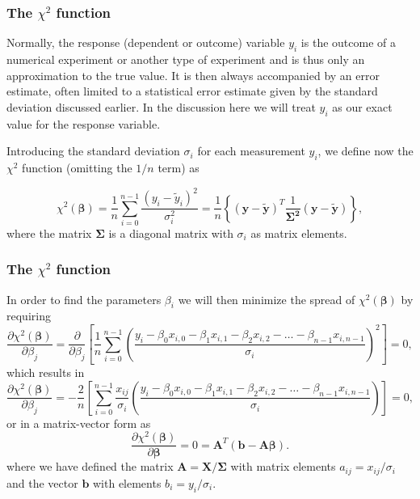 \documentclass{beamer}
\begin{document}
\begin{frame}
\frametitle{The $\chi^2$ function}

\begin{block}{}

Normally, the response (dependent or outcome) variable $y_i$ is the
outcome of a numerical experiment or another type of experiment and is
thus only an approximation to the true value. It is then always
accompanied by an error estimate, often limited to a statistical error
estimate given by the standard deviation discussed earlier. In the
discussion here we will treat $y_i$ as our exact value for the
response variable.

Introducing the standard deviation $\sigma_i$ for each measurement
$y_i$, we define now the $\chi^2$ function (omitting the $1/n$ term)
as

\[
\chi^2(\bm{\beta})=\frac{1}{n}\sum_{i=0}^{n-1}\frac{\left(y_i-\tilde{y}_i\right)^2}{\sigma_i^2}=\frac{1}{n}\left\{\left(\bm{y}-\bm{\tilde{y}}\right)^T\frac{1}{\bm{\Sigma^2}}\left(\bm{y}-\bm{\tilde{y}}\right)\right\},
\]
where the matrix $\bm{\Sigma}$ is a diagonal matrix with $\sigma_i$ as matrix elements. 

\end{block}
\end{frame}

\begin{frame}
\frametitle{The $\chi^2$ function}

\begin{block}{}

In order to find the parameters $\beta_i$ we will then minimize the spread of $\chi^2(\bm{\beta})$ by requiring
\[
\frac{\partial \chi^2(\bm{\beta})}{\partial \beta_j} = \frac{\partial }{\partial \beta_j}\left[ \frac{1}{n}\sum_{i=0}^{n-1}\left(\frac{y_i-\beta_0x_{i,0}-\beta_1x_{i,1}-\beta_2x_{i,2}-\dots-\beta_{n-1}x_{i,n-1}}{\sigma_i}\right)^2\right]=0, 
\]
which results in
\[
\frac{\partial \chi^2(\bm{\beta})}{\partial \beta_j} = -\frac{2}{n}\left[ \sum_{i=0}^{n-1}\frac{x_{ij}}{\sigma_i}\left(\frac{y_i-\beta_0x_{i,0}-\beta_1x_{i,1}-\beta_2x_{i,2}-\dots-\beta_{n-1}x_{i,n-1}}{\sigma_i}\right)\right]=0, 
\]
or in a matrix-vector form as
\[
\frac{\partial \chi^2(\bm{\beta})}{\partial \bm{\beta}} = 0 = \bm{A}^T\left( \bm{b}-\bm{A}\bm{\beta}\right).  
\]
where we have defined the matrix $\bm{A} =\bm{X}/\bm{\Sigma}$ with matrix elements $a_{ij} = x_{ij}/\sigma_i$ and the vector $\bm{b}$ with elements $b_i = y_i/\sigma_i$.   
\end{block}
\end{frame}
\end{document}
